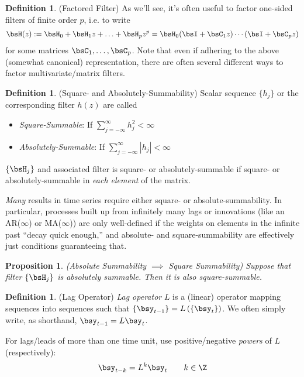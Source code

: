 \documentclass[12pt]{article}
\theoremstyle{plain}
\newtheorem{prop}[thm]{Proposition}
\theoremstyle{definition}
\newtheorem{defn}[thm]{Definition}
\theoremstyle{remark}
\begin{document}
\begin{defn}(Factored Filter)
\label{defn:factoredfilter}
As we'll see, it's often useful to factor one-sided filters of finite
order $p$, i.e. to write
\begin{align*}
  \bsH(z)
  := \bsH_0 + \bsH_1 z+ \ldots + \bsH_pz^p
  = \bsH_0(\bsI+\bsC_1 z)\cdots(\bsI+\bsC_pz)
\end{align*}
for some matrices $\bsC_1,\ldots,\bsC_p$.
Note that even if adhering to the above (somewhat canonical)
representation, there are often several different ways to factor
multivariate/matrix filters.
\end{defn}

\begin{defn}(Square- and Absolutely-Summability)
Scalar sequence $\{h_j\}$ or the corresponding filter $h(z)$ are called
\begin{itemize}
  \item \emph{Square-Summable}: If $\sum_{j=-\infty}^\infty h_j^2<\infty$
  \item \emph{Absolutely-Summable}: If $\sum_{j=-\infty}^\infty |h_j|<\infty$
\end{itemize}
$\{\bsH_j\}$ and associated filter is square- or
absolutely-summable if square- or absolutely-summable in
\emph{each element} of the matrix.

\emph{Many} results in time series require either square- or
absolute-summability.
In particular, processes built up from infinitely many lags or
innovations (like an AR($\infty$) or MA($\infty$)) are only well-defined
if the weights on elements in the infinite past ``decay quick enough,''
and absolute- and square-summability are effectively just conditions
guaranteeing that.
\end{defn}

\begin{prop}\emph{(Absolute Summability $\implies$ Square Summability)}
Suppose that filter $\{\bsH_j\}$ is absolutely summable. Then it is also
square-summable.
\end{prop}

\begin{defn}(Lag Operator)
\emph{Lag operator} $L$ is a (linear) operator mapping sequences into
sequences such that $\{\bsy_{t-1}\}=L\left(\{\bsy_t\}\right)$. We often
simply write, as shorthand, $\bsy_{t-1}=L\bsy_t$.

For lags/leads of more than one time unit, use positive/negative
\emph{powers} of $L$ (respectively):
\begin{align*}
  \bsy_{t-k} = L^k \bsy_t
  \qquad k\in\Z
\end{align*}
\end{defn}
\end{document}
